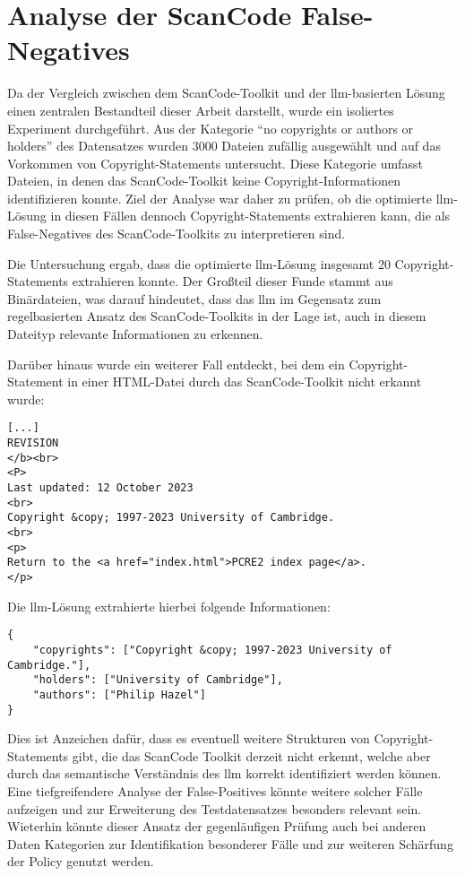 
\section{Analyse der ScanCode False-Negatives}

Da der Vergleich zwischen dem ScanCode-Toolkit und der \gls{llm}-basierten Lösung einen zentralen Bestandteil dieser Arbeit darstellt, wurde ein isoliertes Experiment durchgeführt.
Aus der Kategorie \enquote{no copyrights or authors or holders} des Datensatzes wurden \num{3000} Dateien zufällig ausgewählt und auf das Vorkommen von Copyright-Statements untersucht.
Diese Kategorie umfasst Dateien, in denen das ScanCode-Toolkit keine Copyright-Informationen identifizieren konnte.
Ziel der Analyse war daher zu prüfen, ob die optimierte \gls{llm}-Lösung in diesen Fällen dennoch Copyright-Statements extrahieren kann, die als False-Negatives des ScanCode-Toolkits zu interpretieren sind.

Die Untersuchung ergab, dass die optimierte \gls{llm}-Lösung insgesamt \num{20} Copyright-Statements extrahieren konnte.
Der Großteil dieser Funde stammt aus Binärdateien, was darauf hindeutet, dass das \gls{llm} im Gegensatz zum regelbasierten Ansatz des ScanCode-Toolkits in der Lage ist, auch in diesem Dateityp relevante Informationen zu erkennen.

Darüber hinaus wurde ein weiterer Fall entdeckt, bei dem ein Copyright-Statement in einer HTML-Datei durch das ScanCode-Toolkit nicht erkannt wurde:

\begin{lstlisting}[keepspaces=true]
[...]
REVISION
</b><br>
<P>
Last updated: 12 October 2023
<br>
Copyright &copy; 1997-2023 University of Cambridge.
<br>
<p>
Return to the <a href="index.html">PCRE2 index page</a>.
</p>
\end{lstlisting}

Die \gls{llm}-Lösung extrahierte hierbei folgende Informationen:

\begin{lstlisting}[keepspaces=true]
{
    "copyrights": ["Copyright &copy; 1997-2023 University of Cambridge."],
    "holders": ["University of Cambridge"],
    "authors": ["Philip Hazel"]
}
\end{lstlisting}

Dies ist Anzeichen dafür, dass es eventuell weitere Strukturen von Copyright-Statements gibt, die das ScanCode Toolkit derzeit nicht erkennt, welche aber durch das semantische Verständnis des \gls{llm} korrekt identifiziert werden können.
Eine tiefgreifendere Analyse der False-Positives könnte weitere solcher Fälle aufzeigen und zur Erweiterung des Testdatensatzes besonders relevant sein.
Wieterhin könnte dieser Ansatz der gegenläufigen Prüfung auch bei anderen Daten Kategorien zur Identifikation besonderer Fälle und zur weiteren Schärfung der Policy genutzt werden.